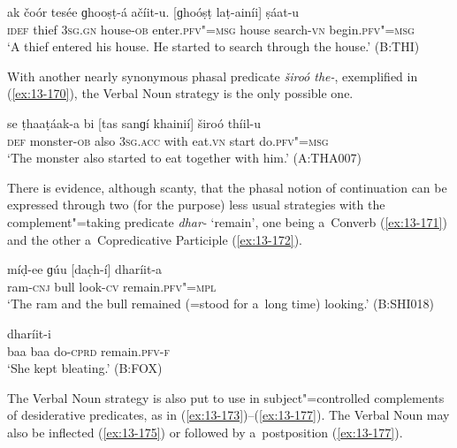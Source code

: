 \begin{exe}
\ex
\label{ex:13-169}
\gll ak čoór tesée ɡhooṣṭ-á ačíit-u. [ɡhoóṣṭ  laṭ-ainíi] ṣáat-u \\
\textsc{idef} thief \textsc{3sg.gn} house-\textsc{ob} enter.\textsc{pfv"=msg} house search-\textsc{vn} begin.\textsc{pfv"=msg} \\
\glt `A thief entered his house. He started to search through the house.' (B:THI) 
\end{exe}

With another nearly synonymous phasal predicate \textit{široó the-}, exemplified in (\ref{ex:13-170}), the Verbal Noun strategy is the only possible one.

\begin{exe}
\ex
\label{ex:13-170}
\gll se ṭhaaṭáak-a bi [tas sanɡí khainií]  široó thíil-u \\
\textsc{def} monster-\textsc{ob} also \textsc{3sg.acc} with eat.\textsc{vn} start do.\textsc{pfv"=msg} \\
\glt `The monster also started to eat together with him.' (A:THA007) 
\end{exe}

There is evidence, although scanty, that the phasal notion of continuation can be expressed through two (for the purpose) less usual strategies with the complement"=taking predicate \textit{dhar-} `remain', one being a~Converb (\ref{ex:13-171}) and the other a~Copredicative Participle (\ref{ex:13-172}).

\begin{exe}
\ex
\label{ex:13-171}
\gll míḍ-ee ɡúu [dac̣h-í] dharíit-a \\
ram-\textsc{cnj} bull look-\textsc{cv} remain.\textsc{pfv"=mpl} \\
\glt `The ram and the bull remained (=stood for a~long time) looking.' (B:SHI018)

\ex
\label{ex:13-172}
 dharíit-i  \\
baa baa do-\textsc{cprd} remain.\textsc{pfv-f} \\
\glt `She kept bleating.' (B:FOX) 
\end{exe}

 The Verbal Noun strategy is also put to use in
subject"=controlled complements of desiderative predicates, as in
(\ref{ex:13-173})--(\ref{ex:13-177}). The Verbal Noun may also be inflected
(\ref{ex:13-175}) or followed by
a~postposition (\ref{ex:13-177}).

